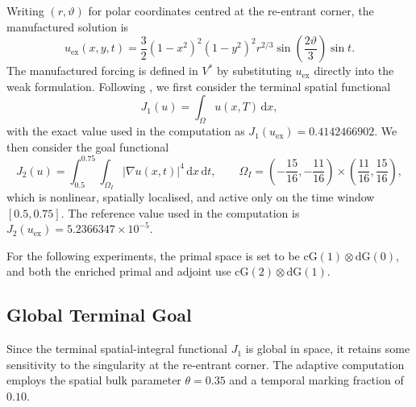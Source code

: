 Writing $(r,\vartheta)$ for polar coordinates centred at the re-entrant corner, the manufactured solution is
\begin{equation}
 u_{\mathrm{ex}}(x,y,t)
 =\frac32(1-x^2)^2(1-y^2)^2
 r^{2/3}\sin\!\left(\frac{2\vartheta}{3}\right)\sin t .
\end{equation}
The manufactured forcing is defined in \(V^\ast\) by substituting \(u_{\mathrm{ex}}\) directly into the weak formulation.
Following \cite[Section~6.4.3]{ENDTMAYER202419}, we first consider the terminal spatial functional
\begin{equation}
  J_1(u)=\int_{\Omega}u(x,T)\,\mathrm dx,
  \label{eq:lshape-j1-terminal}
\end{equation}
with the exact value used in the computation as
\(
J_1(u_{\mathrm{ex}})
 =0.4142466902.
\)
We then consider the goal functional
\begin{equation}
  J_2(u)
  =\int_{0.5}^{0.75}\int_{\Omega_I}
  |\nabla u(x,t)|^4\,\mathrm dx\,\mathrm dt,
  \qquad
  \Omega_I=
  \left(-\frac{15}{16},-\frac{11}{16}\right)
  \times
  \left(\frac{11}{16},\frac{15}{16}\right),
  \label{eq:lshape-j2-local}
\end{equation}
which is nonlinear, spatially localised, and active only on the time window $[0.5,0.75]$. The reference value used in the computation is
\(
J_2(u_{\mathrm{ex}})=5.2366347\times10^{-5}.
\)

For the following experiments, the primal space is set to be $\mathrm{cG}(1) \otimes \mathrm{dG}(0)$, and both the enriched primal and adjoint use $\mathrm{cG}(2) \otimes \mathrm{dG}(1)$.


\subsection{Global Terminal Goal}

Since the terminal spatial-integral functional $J_1$ is global in space, it retains some sensitivity to the singularity at the re-entrant corner. The adaptive computation employs the spatial bulk parameter $\theta=0.35$ and a temporal marking fraction of $0.10$.

